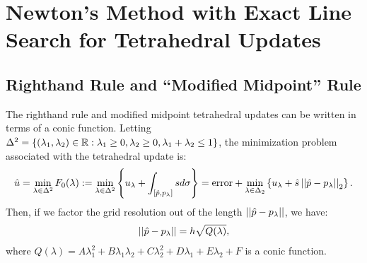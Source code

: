 \documentclass{article}
\begin{document}
\section{Newton's Method with Exact Line Search for Tetrahedral Updates}

\subsection{Righthand Rule and ``Modified Midpoint'' Rule}

The righthand rule and modified midpoint tetrahedral updates can be
written in terms of a conic function. Letting
$\Delta^2 = \left\{(\lambda_1, \lambda_2) \in \mathbb{R} : \lambda_1 \geq 0,
  \lambda_2 \geq 0, \lambda_1 + \lambda_2 \leq 1\right\}$, the minimization
problem associated with the tetrahedral update is:
\begin{align*}
  \hat{u} = \min_{\lambda \in \Delta^2} F_0(\lambda) := \min_{\lambda \in \Delta^2} \left\{u_\lambda + \int_{[\hat{p}, p_\lambda]} s d\sigma\right\} = \mbox{error} + \min_{\lambda \in \Delta_2} \left\{u_\lambda + \hat{s} \left|\left|\hat{p} - p_\lambda\right|\right|_2\right\}.
\end{align*}
Then, if we factor the grid resolution out of the length
$\left|\left|\hat{p} - p_\lambda\right|\right|$, we have:
\begin{align*}
  \left|\left|\hat{p} - p_\lambda\right|\right| = h \sqrt{Q(\lambda)},
\end{align*}
where
$Q(\lambda) = A\lambda_1^2 + B\lambda_1\lambda_2 + C\lambda_2^2 +
D\lambda_1 + E\lambda_2 + F$ is a conic function.
\end{document}
